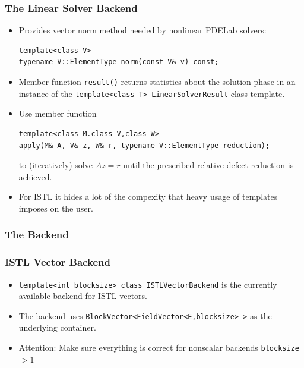 \begin{frame}[fragile]
  \frametitle<presentation>{The Linear Solver Backend}
  \begin{itemize}
  \item Provides vector norm method needed by nonlinear PDELab solvers:
      \begin{lstlisting}
template<class V>
typename V::ElementType norm(const V& v) const;
      \end{lstlisting}
    \item Member function \lstinline!result()! returns statistics
      about the solution phase in an instance of the
      \lstinline!template<class T> LinearSolverResult! class template.
\item Use member function 
  \begin{lstlisting}
template<class M.class V,class W>
apply(M& A, V& z, W& r, typename V::ElementType reduction);
  \end{lstlisting}
  to (iteratively) solve $Az=r$ until the prescribed relative defect
  reduction is achieved.
  \item For ISTL it hides a lot of the compexity that heavy usage of
    templates imposes on the user.
  \end{itemize}
\end{frame}

\subsubsection{The Backend}
\label{sec:backend}

\begin{frame}
  \frametitle{ISTL Vector Backend}
  \begin{itemize}
  \item \lstinline!template<int blocksize> class ISTLVectorBackend!
    is the currently available backend for ISTL vectors.
  \item The backend uses
    \lstinline!BlockVector<FieldVector<E,blocksize> >! as the
    underlying container.
  \item Attention: Make sure everything is correct for nonscalar backends
    \lstinline!blocksize!$>1$
  \end{itemize}
\end{frame}

